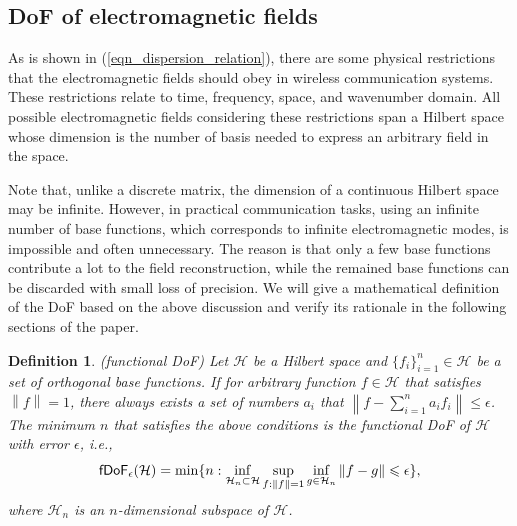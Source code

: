 \documentclass[12pt,draftclsnofoot,journal,onecolumn]{IEEEtran}
\newtheorem{definition}{Definition}
\begin{document}
{\color{red}
\subsection{DoF of electromagnetic fields}

As is shown in (\ref{eqn_dispersion_relation}), there are some physical restrictions that the electromagnetic fields should obey in wireless communication systems. These restrictions relate to time, frequency, space, and wavenumber domain. All possible electromagnetic fields considering these restrictions span a Hilbert space whose dimension is the number of basis needed to express an arbitrary field in the space. 

Note that, unlike a discrete matrix, the dimension of a continuous Hilbert space may be infinite. However, in practical communication tasks, using an infinite number of base functions, which corresponds to infinite electromagnetic modes, is impossible and often unnecessary. The reason is that only a few base functions contribute a lot to the field reconstruction, while the remained base functions can be discarded with small loss of precision. We will give a mathematical definition of the DoF based on the above discussion and verify its rationale in the following sections of the paper. 
}

\begin{definition}
	\label{def_fDoF}
		(functional DoF) Let $\mathcal{H}$ be a Hilbert space and $\{f_i\}_{i=1}^n \in \mathcal{H}$ be a set of orthogonal base functions. If for arbitrary function $f \in \mathcal{H}$ that satisfies $\left\| f \right\|=1$, there always exists a set of numbers $a_i$ that 
		$\left\| f-\sum_{i=1}^n a_i f_i  \right\| \leqslant \epsilon$. The minimum $n$ that satisfies the above conditions is the functional DoF of $\mathcal{H}$ with error $\epsilon$, i.e.,
		\begin{equation}
			\mathsf{fDoF}_{\epsilon} (\mathcal{H}) = {\rm min}\{ n: \underset{\mathcal{H}_n \subset \mathcal{H}}{\rm inf} \sup_{f: \left\| f \right\|=1} \inf_{g \in \mathcal{H}_n} \left\| f-g \right\| \leqslant \epsilon  \},
		\end{equation}
		where $\mathcal{H}_n$ is an $n$-dimensional subspace of $\mathcal{H}$.
	\end{definition}
\end{document}

